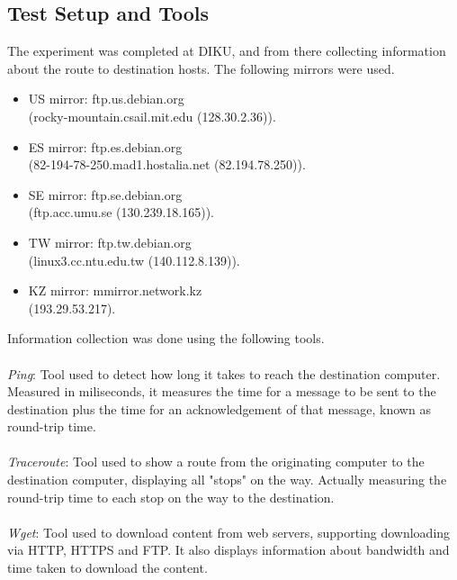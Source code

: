 \documentclass{acm_proc_article-sp}
\begin{document}
\subsection{Test Setup and Tools}\label{6}
The experiment was completed at DIKU, and from there collecting information about the route to destination hosts. The following mirrors were used.
\begin{itemize}
\item US mirror: ftp.us.debian.org \\(rocky-mountain.csail.mit.edu (128.30.2.36)).
\item ES mirror: ftp.es.debian.org \\(82-194-78-250.mad1.hostalia.net (82.194.78.250)).
\item SE mirror: ftp.se.debian.org \\(ftp.acc.umu.se (130.239.18.165)).
\item TW mirror: ftp.tw.debian.org \\(linux3.cc.ntu.edu.tw (140.112.8.139)).
\item KZ mirror: mmirror.network.kz\\ (193.29.53.217).
\end{itemize}
Information collection was done using the following tools.\\
\\
\textit{Ping}: Tool used to detect how long it takes to reach the destination computer. Measured in miliseconds, it measures the time for a message to be sent to the destination plus the time for an acknowledgement of that message, known as round-trip time.\\
\\
\textit{Traceroute}: Tool used to show a route from the originating computer to the destination computer, displaying all "stops" on the way. Actually measuring the round-trip time to each stop on the way to the destination.\\
\\
\textit{Wget}: Tool used to download content from web servers, supporting downloading via HTTP, HTTPS and FTP. It also displays information about bandwidth and time taken to download the content. 
\end{document}
